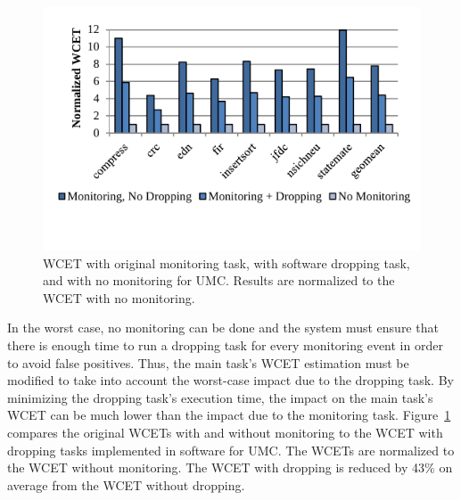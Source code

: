 \begin{figure}
  \begin{center}
    \includegraphics[width=\columnwidth]{monitoring_hard_drop/figs/timing_wcet.pdf}
    \caption{WCET with original monitoring task, with software dropping task,
    and with no monitoring for UMC. Results are normalized to the WCET with no
    monitoring.}
    \label{fig:monitoring_hard_drop.drop.wcet} 
  \end{center}
\end{figure}

In the worst case, no monitoring can be done and the system must ensure that
there is enough time to run a dropping task for every monitoring event in order
to avoid false positives.  Thus, the main task's WCET estimation must be
modified to take into account the worst-case impact due to the dropping task.
By minimizing the dropping task's execution time, the impact on the main task's
WCET can be much lower than the impact due to the monitoring task.
Figure~\ref{fig:monitoring_hard_drop.drop.wcet} compares the original WCETs
with and without monitoring to the WCET with dropping tasks implemented in
software for UMC. The WCETs are normalized to the WCET without monitoring.  The
WCET with dropping is reduced by 43\% on average from the WCET without
dropping. 


